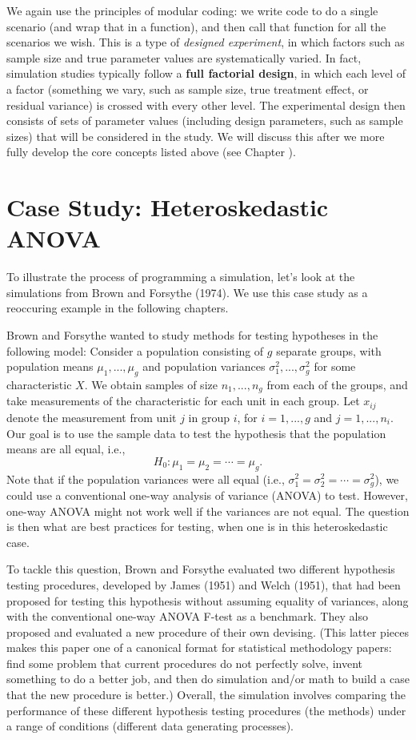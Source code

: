 \documentclass[
]{book}
\begin{document}
We again use the principles of modular coding: we write code to do a single scenario (and wrap that in a function), and then call that function for all the scenarios we wish.
This is a type of \emph{designed experiment}, in which factors such as sample size and true parameter values are systematically varied.
In fact, simulation studies typically follow a \textbf{full factorial design}, in which each level of a factor (something we vary, such as sample size, true treatment effect, or residual variance) is crossed with every other level.
The experimental design then consists of sets of parameter values (including design parameters, such as sample sizes) that will be considered in the study.
We will discuss this after we more fully develop the core concepts listed above (see Chapter \citet{exp_design}).

\hypertarget{case_ANOVA}{%
\chapter{Case Study: Heteroskedastic ANOVA}\label{case_ANOVA}}

To illustrate the process of programming a simulation, let's look at the simulations from Brown and Forsythe (1974).
We use this case study as a reoccuring example in the following chapters.

Brown and Forsythe wanted to study methods for testing hypotheses in the following model: Consider a population consisting of \(g\) separate groups, with population means \(\mu_1,...,\mu_g\) and population variances \(\sigma_1^2,...,\sigma_g^2\) for some characteristic \(X\). We obtain samples of size \(n_1,...,n_g\) from each of the groups, and take measurements of the characteristic for each unit in each group. Let \(x_{ij}\) denote the measurement from unit \(j\) in group \(i\), for \(i = 1,...,g\) and \(j = 1,...,n_i\). Our goal is to use the sample data to test the hypothesis that the population means are all equal, i.e.,
\[
H_0: \mu_1 = \mu_2 = \cdots = \mu_g.
\]
Note that if the population variances were all equal (i.e., \(\sigma_1^2 = \sigma_2^2 = \cdots = \sigma_g^2\)), we could use a conventional one-way analysis of variance (ANOVA) to test.
However, one-way ANOVA might not work well if the variances are not equal.
The question is then what are best practices for testing, when one is in this heteroskedastic case.

To tackle this question, Brown and Forsythe evaluated two different hypothesis testing procedures, developed by James (1951) and Welch (1951), that had been proposed for testing this hypothesis without assuming equality of variances, along with the conventional one-way ANOVA F-test as a benchmark.
They also proposed and evaluated a new procedure of their own devising.
(This latter pieces makes this paper one of a canonical format for statistical methodology papers: find some problem that current procedures do not perfectly solve, invent something to do a better job, and then do simulation and/or math to build a case that the new procedure is better.)
Overall, the simulation involves comparing the performance of these different hypothesis testing procedures (the methods) under a range of conditions (different data generating processes).
\end{document}
